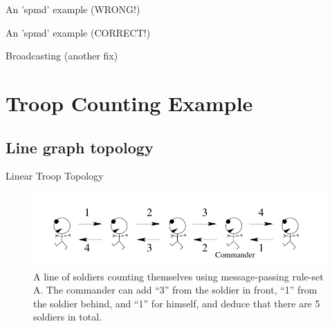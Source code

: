 \documentclass[pdflatex,colorlinks,landscape]{beamer}
\begin{document}
\begin{frame}[allowframebreaks]{An 'spmd' example (WRONG!)}
  \begin{small}
    
  \end{small}
  \begin{tiny}
  \end{tiny}
\end{frame}

\begin{frame}[allowframebreaks]{An 'spmd' example (CORRECT!)}
  \begin{small}
    
  \end{small}
  \begin{tiny}
  \end{tiny}
\end{frame}

\begin{frame}[allowframebreaks]{Broadcasting (another fix)}
  \begin{small}
    
  \end{small}
  \begin{tiny}
  \end{tiny}
\end{frame}

\section{Troop Counting Example}

\subsection{Line graph topology}
\begin{frame}{Linear Troop Topology}
  \begin{figure}[H]
    \begin{center}
      \includegraphics[width=\textwidth]{LinearTroop.png}
    \end{center}
    \caption{A line of soldiers counting themselves using
      message-passing rule-set A. The commander can add ``3'' from the
      soldier in front, ``1'' from the soldier behind, and ``1'' for
      himself, and deduce that there are 5 soldiers in total.}
  \end{figure}
\end{frame}
\end{document}
